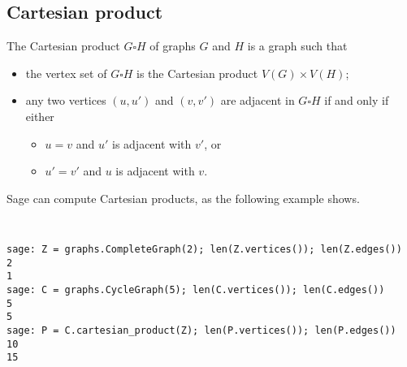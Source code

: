 
\subsection{Cartesian product}

The Cartesian product $G \square H$ of graphs $G$ and $H$ is a graph such that
%
\begin{itemize}
\item the vertex set of $G \square H$ is the Cartesian product
  $V(G) \times V(H)$;

\item any two vertices $(u, u')$ and $(v, v')$ are adjacent in
  $G \square H$ if and only if either
  \begin{itemize}
  \item $ u = v$ and $u'$ is adjacent with $v'$, or

  \item $u' = v'$ and $u$ is adjacent with $v$.
  \end{itemize}
\end{itemize}
%
Sage can compute Cartesian products, as the following example shows.
%
\begin{center}
\fontsize{9pt}{9pt}
\selectfont
\tt
\begin{lstlisting}
sage: Z = graphs.CompleteGraph(2); len(Z.vertices()); len(Z.edges())
2
1
sage: C = graphs.CycleGraph(5); len(C.vertices()); len(C.edges())
5
5
sage: P = C.cartesian_product(Z); len(P.vertices()); len(P.edges())
10
15
\end{lstlisting}
\end{center}

